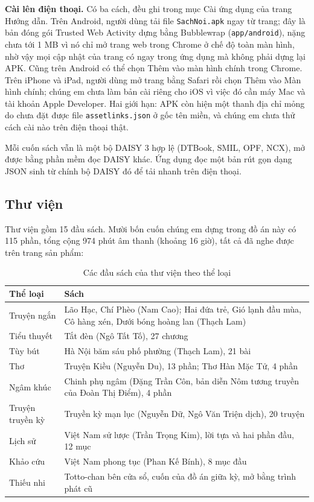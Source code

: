 \documentclass[12pt,a4paper]{article}
\begin{document}
\textbf{Cài lên điện thoại.} Có ba cách, đều ghi trong mục Cài ứng dụng của trang Hướng dẫn. Trên Android, người dùng tải file \texttt{SachNoi.apk} ngay từ trang; đây là bản đóng gói Trusted Web Activity dựng bằng Bubblewrap (\texttt{app/android}), nặng chưa tới 1 MB vì nó chỉ mở trang web trong Chrome ở chế độ toàn màn hình, nhờ vậy mọi cập nhật của trang có ngay trong ứng dụng mà không phải dựng lại APK. Cũng trên Android có thể chọn Thêm vào màn hình chính trong Chrome. Trên iPhone và iPad, người dùng mở trang bằng Safari rồi chọn Thêm vào Màn hình chính; chúng em chưa làm bản cài riêng cho iOS vì việc đó cần máy Mac và tài khoản Apple Developer. Hai giới hạn: APK còn hiện một thanh địa chỉ mỏng do chưa đặt được file \texttt{assetlinks.json} ở gốc tên miền, và chúng em chưa thử cách cài nào trên điện thoại thật.

Mỗi cuốn sách vẫn là một bộ DAISY 3 hợp lệ (DTBook, SMIL, OPF, NCX), mở được bằng phần mềm đọc DAISY khác. Ứng dụng đọc một bản rút gọn dạng JSON sinh từ chính bộ DAISY đó để tải nhanh trên điện thoại.

\subsection{Thư viện}

Thư viện gồm 15 đầu sách. Mười bốn cuốn chúng em dựng trong đồ án này có 115 phần, tổng cộng 974 phút âm thanh (khoảng 16 giờ), tất cả đã nghe được trên trang sản phẩm:

{\small
\begin{longtable}[]{@{}>{\raggedright\arraybackslash}p{2.8cm}>{\raggedright\arraybackslash}p{12.0cm}@{}}
\caption{Các đầu sách của thư viện theo thể loại}\label{tab:thu-vien}\\
\toprule\noalign{}
Thể loại & Sách \\
\midrule\noalign{}
\endhead
\bottomrule\noalign{}
\endlastfoot
Truyện ngắn & Lão Hạc, Chí Phèo (Nam Cao); Hai đứa trẻ, Gió lạnh đầu mùa, Cô hàng xén, Dưới bóng hoàng lan (Thạch Lam) \\
Tiểu thuyết & Tắt đèn (Ngô Tất Tố), 27 chương \\
Tùy bút & Hà Nội băm sáu phố phường (Thạch Lam), 21 bài \\
Thơ & Truyện Kiều (Nguyễn Du), 13 phần; Thơ Hàn Mặc Tử, 4 phần \\
Ngâm khúc & Chinh phụ ngâm (Đặng Trần Côn, bản diễn Nôm tương truyền của Đoàn Thị Điểm), 4 phần \\
Truyện truyền kỳ & Truyền kỳ mạn lục (Nguyễn Dữ, Ngô Văn Triện dịch), 20 truyện \\
Lịch sử & Việt Nam sử lược (Trần Trọng Kim), lời tựa và hai phần đầu, 12 mục \\
Khảo cứu & Việt Nam phong tục (Phan Kế Bính), 8 mục đầu \\
Thiếu nhi & Totto-chan bên cửa sổ, cuốn của đồ án giữa kỳ, mở bằng trình phát cũ \\
\end{longtable}
}
\end{document}

